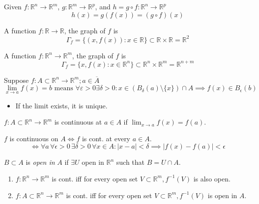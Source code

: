 \documentclass[a4paper]{article}
\numberwithin{equation}{section}
\newcommand{\R}{\mathbb{R}}
\begin{document}
\begin{definition}[Composition]
    Given $f:\R^n\to\R^m$, $g:\R^m\to\R^p$, and $h=g\circ f:\R^n\to\R^p$
    \begin{equation}
        h(x)=g(f(x))=(g\circ f)(x)
    \end{equation}
\end{definition}
\begin{definition}[Graph]
    A function $f:\R\to\R$, the graph of $f$ is 
    \begin{equation}
        \Gamma_f=\{(x,f(x)):x\in\R\}\subset\R\times\R=\R^2
    \end{equation}

    A function $f:\R^n\to\R^m$, the graph of $f$ is 
    \begin{equation}
        \Gamma_f=\{x,f(x):x\in\R^n\}\subset\R^n\times\R^m=\R^{n+m}
    \end{equation}
\end{definition}
\begin{definition}[Limit]
    Suppose $f:A\subset\R^n\to\R^m;a\in\overline A$
    \begin{equation}
        \lim_{x\to a}f(x)=b \text{ means } \forall\varepsilon>0\exists\delta>0:x\in (B_\delta(a)\setminus\{x\})\cap A\implies f(x)\in B_\epsilon(b)
    \end{equation}

    \begin{itemize}
        \item If the limit exists, it is unique.
    \end{itemize}
\end{definition}
\begin{definition}[Continuity]
    $f:A\subset\R^n\to\R^m$ is continuous at $a\in A$ if $\lim_{x\to a}f(x)=f(a)$.

    $f$ is continuous on $A\iff f$ is cont. at every $a\in A$.
    \begin{equation}
        \iff\forall a\,\forall\epsilon>0\,\exists\delta>0\,\forall x\in A:|x-a|<\delta\implies|f(x)-f(a)|<\epsilon
    \end{equation}
\end{definition}
\begin{definition}
    $B\subset A$ is \textit{open in }$A$ if $\exists U$ open in $\R^n$ such that $B=U\cap A$.
\end{definition}
\begin{theorem}
    \begin{enumerate}
        \item $f:\R^n\to\R^m$ is cont. iff for every open set $V\subset\R^m, f^{-1}(V)$ is also open.
        \item $f:A\subset\R^n\to\R^m$ is cont. iff for every open set $V\subset\R^m, f^{-1}(V)$ is open in $A$.
    \end{enumerate}
\end{theorem}
\end{document}
